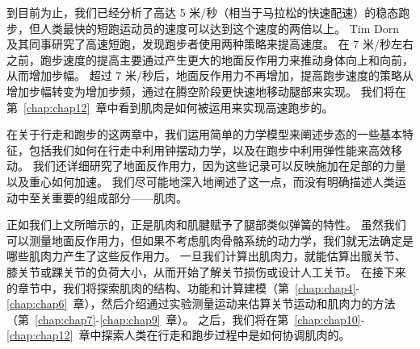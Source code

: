 到目前为止，我们已经分析了高达 5 米/秒（相当于马拉松的快速配速）的稳态跑步，但人类最快的短跑运动员的速度可以达到这个速度的两倍以上。
Tim Dorn 及其同事研究了高速短跑，发现跑步者使用两种策略来提高速度\cite{dorn2012muscular}。
在 7 米/秒左右之前，跑步速度的提高主要通过产生更大的地面反作用力来推动身体向上和向前，从而增加步幅。
超过 7 米/秒后，地面反作用力不再增加，提高跑步速度的策略从增加步幅转变为增加步频，通过在腾空阶段更快速地移动腿部来实现。
我们将在第~\ref{chap:chap12}~章中看到肌肉是如何被运用来实现高速跑步的。


在关于行走和跑步的这两章中，我们运用简单的力学模型来阐述步态的一些基本特征，包括我们如何在行走中利用钟摆动力学，以及在跑步中利用弹性能来高效移动。
我们还详细研究了地面反作用力，因为这些记录可以反映施加在足部的力量以及重心如何加速。
我们尽可能地深入地阐述了这一点，而没有明确描述人类运动中至关重要的组成部分——肌肉。


正如我们上文所暗示的，正是肌肉和肌腱赋予了腿部类似弹簧的特性。
虽然我们可以测量地面反作用力，但如果不考虑肌肉骨骼系统的动力学，我们就无法确定是哪些肌肉力产生了这些反作用力。
一旦我们计算出肌肉力，就能估算出髋关节、膝关节或踝关节的负荷大小，从而开始了解关节损伤或设计人工关节。
在接下来的章节中，我们将探索肌肉的结构、功能和计算建模（第~\ref{chap:chap4}-\ref{chap:chap6}~章），然后介绍通过实验测量运动来估算关节运动和肌肉力的方法（第~\ref{chap:chap7}-\ref{chap:chap9}~章）。
之后，我们将在第~\ref{chap:chap10}-\ref{chap:chap12}~章中探索人类在行走和跑步过程中是如何协调肌肉的。










